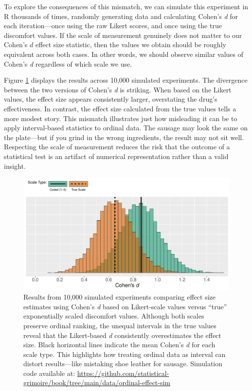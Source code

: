 To explore the consequences of this mismatch, we can simulate this experiment in R thousands of times, randomly generating data and calculating Cohen’s \textit{d} for each iteration—once using the raw Likert scores, and once using the true discomfort values. If the scale of measurement genuinely does not matter to our Cohen's $d$ effect size statistic, then the values we obtain should be roughly equivalent across both cases. In other words, we should observe similar values of Cohen’s \textit{d} regardless of which scale we use.

Figure \ref{fig:ord_vs_int_effect} displays the results across 10,000 simulated experiments. The divergence between the two versions of Cohen’s \textit{d} is striking. When based on the Likert values, the effect size appears consistently larger, overstating the drug’s effectiveness. In contrast, the effect size calculated from the true values tells a more modest story. This mismatch illustrates just how misleading it can be to apply interval-based statistics to ordinal data. The sausage may look the same on the plate—but if you grind in the wrong ingredients, the result may not sit well. Respecting the scale of measurement reduces the risk that the outcome of a statistical test is an artifact of numerical representation rather than a valid insight.

\begin{figure}[h]
\includegraphics[width = \textwidth]{data/ordinal-effect-sim/ord_vs_int_effect.pdf}
\caption{Results from 10,000 simulated experiments comparing effect size estimates using Cohen’s \textit{d} based on Likert-scale values versus ``true'' exponentially scaled discomfort values. Although both scales preserve ordinal ranking, the unequal intervals in the true values reveal that the Likert-based \textit{d} consistently overestimates the effect size. Black horizontal lines indicate the mean Cohen’s \textit{d} for each scale type. This highlights how treating ordinal data as interval can distort results—like mistaking shoe leather for sausage.
Simulation code available at: \url{https://github.com/statistical-grimoire/book/tree/main/data/ordinal-effect-sim}}
\label{fig:ord_vs_int_effect}
\end{figure}

